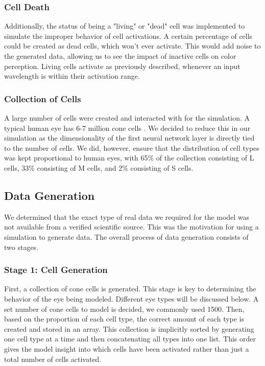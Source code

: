 \documentclass[titlepage]{article}
\begin{document}
\subsubsection{Cell Death}

Additionally, the status of being a "living" or "dead" cell was implemented to simulate the improper behavior of cell activations. A certain percentage of cells could be created as dead cells, which won't ever activate. This would add noise to the generated data, allowing us to see the impact of inactive cells on color perception. Living cells activate as previously described, whenever an input wavelength is within their activation range.

\subsubsection{Collection of Cells}

A large number of cells were created and interacted with for the simulation. A typical human eye has 6-7 million cone cells \cite{conebreakdown}. We decided to reduce this in our simulation as the dimensionality of the first neural network layer is directly tied to the number of cells. We did, however, ensure that the distribution of cell types was kept proportional to human eyes, with 65\% of the collection consisting of L cells, 33\% consisting of M cells, and 2\% consisting of S cells. 

\subsection{Data Generation}

We determined that the exact type of real data we required for the model was not available from a verified scientific source. This was the motivation for using a simulation to generate data. The overall process of data generation consists of two stages. 

\subsubsection{Stage 1: Cell Generation}

First, a collection of cone cells is generated. This stage is key to determining the behavior of the eye being modeled. Different eye types will be discussed below. A set number of cone cells to model is decided, we commonly used 1500. Then, based on the proportion of each cell type, the correct amount of each type is created and stored in an array. This collection is implicitly sorted by generating one cell type at a time and then concatenating all types into one list. This order gives the model insight into which cells have been activated rather than just a total number of cells activated.
\end{document}

